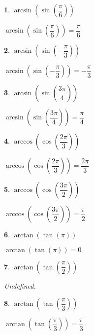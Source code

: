 \documentclass{amsbook}
\newtheorem{exc}{}
\newenvironment{ex}{\begin{exc}\normalfont}{\end{exc}}
\numberwithin{section}{chapter}
\numberwithin{equation}{chapter}
\begin{document}
\begin{multicols}{2}
\begin{ex}
	 $\arcsin\left(\sin\left(\dfrac{\pi}{6}\right) \right)$
	\begin{sol}
		 $\arcsin\left(\sin\left(\dfrac{\pi}{6}\right) \right) = \dfrac{\pi}{6}$
	\end{sol}
\end{ex}
 \begin{ex}
	 $\arcsin\left(\sin\left(-\dfrac{\pi}{3}\right) \right) $
	\begin{sol}
		 $\arcsin\left(\sin\left(-\dfrac{\pi}{3}\right) \right) = -\dfrac{\pi}{3}$
	\end{sol}
\end{ex}


\begin{ex}
	$\arcsin\left(\sin\left(\dfrac{3\pi}{4}\right) \right) $
	\begin{sol}
		$\arcsin\left(\sin\left(\dfrac{3\pi}{4}\right) \right) = \dfrac{\pi}{4}$
	\end{sol}
\end{ex}

\begin{ex}
	 $\arccos\left(\cos\left(\dfrac{2\pi}{3}\right) \right) $
	\begin{sol}
		 $\arccos\left(\cos\left(\dfrac{2\pi}{3}\right) \right) = \dfrac{2\pi}{3}$
	\end{sol}
\end{ex}
 \begin{ex}
	 $\arccos\left(\cos\left(\dfrac{3\pi}{2}\right) \right)$
	\begin{sol}
		 $\arccos\left(\cos\left(\dfrac{3\pi}{2}\right) \right) = \dfrac{\pi}{2}$
	\end{sol}
\end{ex}


\begin{ex}
	 $\arctan\left(\tan\left(\pi\right) \right) $
	\begin{sol}
			 $\arctan\left(\tan\left(\pi\right) \right) = 0$
	\end{sol}
\end{ex}

\begin{ex}
	$\arctan\left(\tan\left(\dfrac{\pi}{2}\right) \right)$ 
	\begin{sol}
		Undefined.
	\end{sol}
\end{ex}

\begin{ex}
	 $\arctan\left(\tan\left(\dfrac{\pi}{3}\right) \right)$
	\begin{sol}
		 $\arctan\left(\tan\left(\dfrac{\pi}{3}\right) \right) = \dfrac{\pi}{3}$
	\end{sol}
\end{ex}



\end{multicols}
\end{document}

